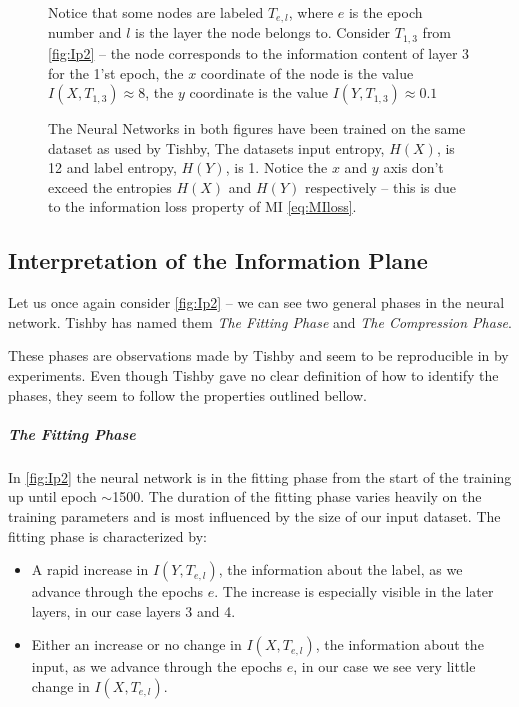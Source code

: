 \documentclass[dissertation.tex]{subfiles}
\begin{document}
\begin{figure}[H]
{    Notice that some nodes are labeled $T_{e,l}$, where $e$ is the epoch number
    and $l$ is the layer the node belongs to. Consider $T_{1,3}$ from
    \autoref{fig:Ip2} -- the node corresponds to the information content of
    layer 3 for the 1'st epoch, the $x$ coordinate of the node is the value
    $I(X, T_{1,3})\approx{8}$, the $y$ coordinate is the value $I(Y,
    T_{1,3})\approx{0.1}$
   
    The Neural Networks in both figures have been trained on the same dataset as
    used by Tishby\cite{TISHBY}, The datasets input entropy, $H(X)$, is 12 and
    label entropy, $H(Y)$, is 1. Notice the $x$ and $y$ axis don't exceed the
    entropies $H(X)$ and $H(Y)$ respectively -- this is due to the information
    loss property of MI \autoref{eq:MIloss}.
  }
\end{figure}

\subsection{Interpretation of the Information Plane}

Let us once again consider \autoref{fig:Ip2} -- we can see two general phases in
the neural network. Tishby has named them \emph{The Fitting Phase} and \emph{The
Compression Phase}. 

These phases are observations made by Tishby and seem to be reproducible in by
experiments. Even though Tishby gave no clear definition of how to identify the
phases, they seem to follow the properties outlined bellow.

\subparagraph{The Fitting Phase} In \autoref{fig:Ip2} the neural network is in
the fitting phase from the start of the training up until epoch $\sim$1500. The
duration of the fitting phase varies heavily on the training parameters and is
most influenced by the size of our input dataset. The fitting phase is
characterized by:
\begin{itemize}
  \item{
      A rapid increase in $I(Y, T_{e,l})$, the information about the label, as
      we advance through the epochs $e$. The increase is especially visible in
      the later layers, in our case layers 3 and 4.
    }
  \item{
      Either an increase or no change in $I(X, T_{e,l})$, the information about
      the input, as we advance through the epochs $e$, in our case we see very
      little change in $I(X,T_{e,l})$.
    }
\end{itemize}
\end{document}

